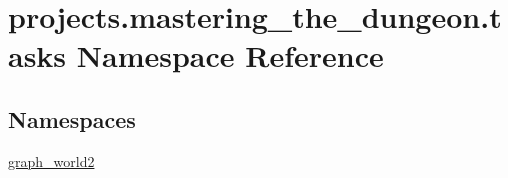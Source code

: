 \hypertarget{namespaceprojects_1_1mastering__the__dungeon_1_1tasks}{}\section{projects.\+mastering\+\_\+the\+\_\+dungeon.\+tasks Namespace Reference}
\label{namespaceprojects_1_1mastering__the__dungeon_1_1tasks}
\subsection*{Namespaces}
\begin{DoxyCompactItemize}
\item 
 \hyperlink{namespaceprojects_1_1mastering__the__dungeon_1_1tasks_1_1graph__world2}{graph\+\_\+world2}
\end{DoxyCompactItemize}
